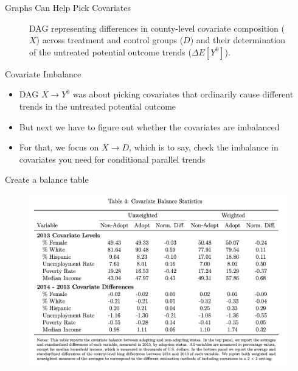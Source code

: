 \documentclass{beamer}
\begin{document}
\begin{frame}{Graphs Can Help Pick Covariates}

\begin{figure}[h!]
    \centering
\caption{DAG representing differences in county-level covariate composition (\(X\)) across treatment and control groups (\(D\)) and their determination of the untreated potential outcome trends (\(\Delta E\left[Y^0\right]\)).}
\end{figure}

\end{frame}



\begin{frame}{Covariate Imbalance}
    \begin{itemize}
    \item DAG $X \rightarrow Y^0$ was about picking covariates that ordinarily cause different trends in the untreated potential outcome
    \item But next we have to figure out whether the covariates are imbalanced
\item For that, we focus on $X \rightarrow D$, which is to say, check the imbalance in covariates you need for conditional parallel trends
\end{itemize}
\end{frame}



\begin{frame}{Create a balance table}

\begin{figure}
    \centering
    \includegraphics[height=0.80\textheight]{./lecture_includes/step6_imbalance}
\end{figure}

\end{frame}
\end{document}
